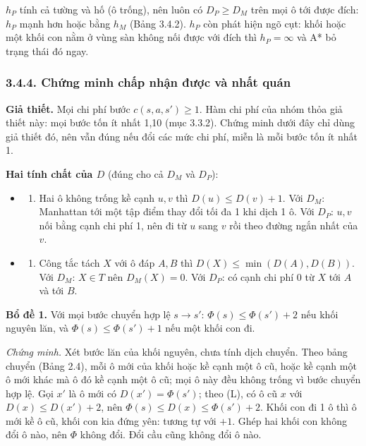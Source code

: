 \(h_P\) tính cả tường và hố (ô trống), nên luôn có \(D_P \ge D_M\) trên mọi ô tới được đích: \(h_P\) mạnh hơn hoặc bằng \(h_M\) (Bảng 3.4.2). \(h_P\) còn phát hiện ngõ cụt: khối hoặc một khối con nằm ở vùng sàn không nối được với đích thì \(h_P = \infty\) và A* bỏ trạng thái đó ngay.

\subsubsection{3.4.4. Chứng minh chấp nhận được và nhất quán}

\textbf{Giả thiết.} Mọi chi phí bước \(c(s, a, s') \ge 1\). Hàm chi phí của nhóm thỏa giả thiết này: mọi bước tốn ít nhất 1,10 (mục 3.3.2). Chứng minh dưới đây chỉ dùng giả thiết đó, nên vẫn đúng nếu đổi các mức chi phí, miễn là mỗi bước tốn ít nhất 1.

\textbf{Hai tính chất của \(D\)} (đúng cho cả \(D_M\) và \(D_P\)):

\begin{itemize}
\tightlist
\item
  \begin{enumerate}
  \def\labelenumi{(\Alph{enumi})}
  \setcounter{enumi}{11}
  \tightlist
  \item
    Hai ô không trống kề cạnh \(u, v\) thì \(D(u) \le D(v) + 1\). Với \(D_M\): Manhattan tới một tập điểm thay đổi tối đa 1 khi dịch 1 ô. Với \(D_P\): \(u, v\) nối bằng cạnh chi phí 1, nên đi từ \(u\) sang \(v\) rồi theo đường ngắn nhất của \(v\).
  \end{enumerate}
\item
  \begin{enumerate}
  \def\labelenumi{(\Alph{enumi})}
  \setcounter{enumi}{18}
  \tightlist
  \item
    Công tắc tách \(X\) với ô đáp \(A, B\) thì \(D(X) \le \min(D(A), D(B))\). Với \(D_M\): \(X \in T\) nên \(D_M(X) = 0\). Với \(D_P\): có cạnh chi phí 0 từ \(X\) tới \(A\) và tới \(B\).
  \end{enumerate}
\end{itemize}

\textbf{Bổ đề 1.} Với mọi bước chuyển hợp lệ \(s \to s'\): \(\Phi(s) \le \Phi(s') + 2\) nếu khối nguyên lăn, và \(\Phi(s) \le \Phi(s') + 1\) nếu một khối con đi.

\emph{Chứng minh.} Xét bước lăn của khối nguyên, chưa tính dịch chuyển. Theo bảng chuyển (Bảng 2.4), mỗi ô mới của khối hoặc kề cạnh một ô cũ, hoặc kề cạnh một ô mới khác mà ô đó kề cạnh một ô cũ; mọi ô này đều không trống vì bước chuyển hợp lệ. Gọi \(x'\) là ô mới có \(D(x') = \Phi(s')\); theo (L), có ô cũ \(x\) với \(D(x) \le D(x') + 2\), nên \(\Phi(s) \le D(x) \le \Phi(s') + 2\). Khối con đi 1 ô thì ô mới kề ô cũ, khối con kia đứng yên: tương tự với \(+1\). Ghép hai khối con không đổi ô nào, nên \(\Phi\) không đổi. Đổi cầu cũng không đổi ô nào.

